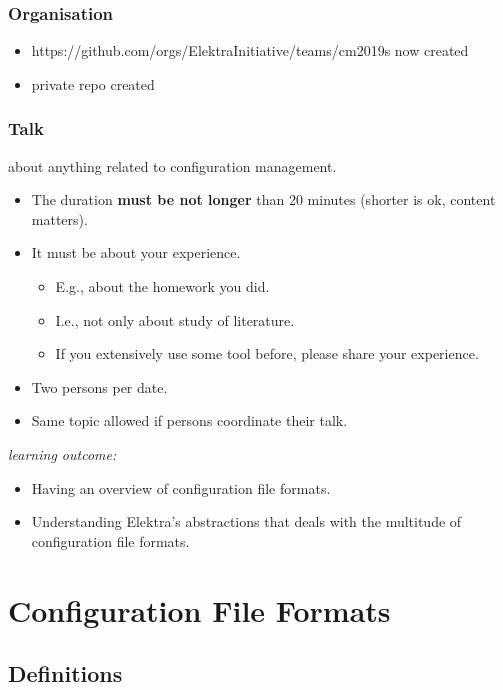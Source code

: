 \begin{frame}
	\frametitle{Organisation}
	\begin{itemize}
	\item https://github.com/orgs/ElektraInitiative/teams/cm2019s now created
	\item private repo created
	\end{itemize}
\end{frame}

\begin{frame}
	\frametitle{Talk}
	about anything related to configuration management.
	\begin{itemize}
		\item The duration \textbf{must be not longer} than 20 minutes (shorter is ok, content matters).
		\item It must be about your experience.
		\begin{itemize}
			\item E.g., about the homework you did.
			\item I.e., not only about study of literature.
			\item If you extensively use some tool before, please share your experience.
		\end{itemize}
		\item Two persons per date.
		\item Same topic allowed if persons coordinate their talk.
	\end{itemize}
\end{frame}

\begin{frame}
	\textit{learning outcome:}
	\begin{itemize}
		\item Having an overview of configuration file formats.
		\item Understanding Elektra's abstractions that deals with the multitude of configuration file formats.
	\end{itemize}
\end{frame}



\section{Configuration File Formats}

\subsection{Definitions}

